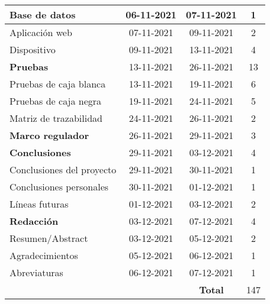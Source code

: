 \begin{longtable}[c]{lcc|c|}
	\multicolumn{1}{|l|}{Base de datos}                      & \multicolumn{1}{c|}{06-11-2021} & 07-11-2021     & 1   \\ \hline
	\multicolumn{1}{|l|}{Aplicación web}                     & \multicolumn{1}{c|}{07-11-2021} & 09-11-2021     & 2   \\ \hline
	\multicolumn{1}{|l|}{Dispositivo}                        & \multicolumn{1}{c|}{09-11-2021} & 13-11-2021     & 4   \\ \hline
	\multicolumn{1}{|l|}{\textbf{Pruebas}}                   & \multicolumn{1}{c|}{13-11-2021} & 26-11-2021     & 13  \\ \hline
	\multicolumn{1}{|l|}{Pruebas de caja blanca}             & \multicolumn{1}{c|}{13-11-2021} & 19-11-2021     & 6   \\ \hline
	\multicolumn{1}{|l|}{Pruebas de caja negra}              & \multicolumn{1}{c|}{19-11-2021} & 24-11-2021     & 5   \\ \hline
	\multicolumn{1}{|l|}{Matriz de trazabilidad}             & \multicolumn{1}{c|}{24-11-2021} & 26-11-2021     & 2   \\ \hline
	\multicolumn{1}{|l|}{\textbf{Marco regulador}}           & \multicolumn{1}{c|}{26-11-2021} & 29-11-2021     & 3   \\ \hline
	\multicolumn{1}{|l|}{\textbf{Conclusiones}}              & \multicolumn{1}{c|}{29-11-2021} & 03-12-2021     & 4   \\ \hline
	\multicolumn{1}{|l|}{Conclusiones del proyecto}          & \multicolumn{1}{c|}{29-11-2021} & 30-11-2021     & 1   \\ \hline
	\multicolumn{1}{|l|}{Conclusiones personales}            & \multicolumn{1}{c|}{30-11-2021} & 01-12-2021     & 1   \\ \hline
	\multicolumn{1}{|l|}{Líneas futuras}                     & \multicolumn{1}{c|}{01-12-2021} & 03-12-2021     & 2   \\ \hline
	\multicolumn{1}{|l|}{\textbf{Redacción}}                 & \multicolumn{1}{c|}{03-12-2021} & 07-12-2021     & 4   \\ \hline
	\multicolumn{1}{|l|}{Resumen/Abstract}                   & \multicolumn{1}{c|}{03-12-2021} & 05-12-2021     & 2   \\ \hline
	\multicolumn{1}{|l|}{Agradecimientos}                    & \multicolumn{1}{c|}{05-12-2021} & 06-12-2021     & 1   \\ \hline
	\multicolumn{1}{|l|}{Abreviaturas}                       & \multicolumn{1}{c|}{06-12-2021} & 07-12-2021     & 1   \\ \hline
	                                                         &                                 & \textbf{Total} & 147 \\ \cline{4-4}
\end{longtable}
